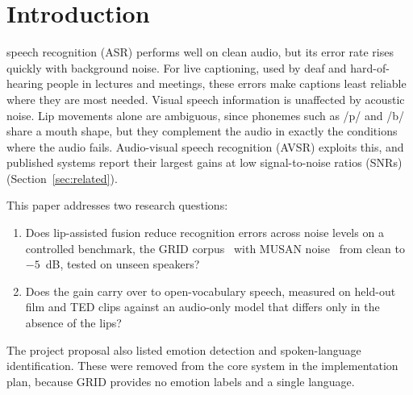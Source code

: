 \section{Introduction}
\label{sec:introduction}

 speech recognition (ASR) performs well on clean audio, but its error rate
rises quickly with background noise. For live captioning, used by deaf and hard-of-hearing people
in lectures and meetings, these errors make captions least reliable where they are most needed.
Visual speech information is unaffected by acoustic noise. Lip movements alone are ambiguous, since
phonemes such as /p/ and /b/ share a mouth shape, but they complement the audio in exactly the
conditions where the audio fails. Audio-visual speech recognition (AVSR) exploits this, and
published systems report their largest gains at low signal-to-noise ratios (SNRs)
(Section~\ref{sec:related}).

This paper addresses two research questions:
\begin{enumerate}
\item Does lip-assisted fusion reduce recognition errors across noise levels on a controlled
benchmark, the GRID corpus~\cite{cooke2006} with MUSAN noise~\cite{snyder2015} from clean to
$-5$~dB, tested on unseen speakers?
\item Does the gain carry over to open-vocabulary speech, measured on held-out film and TED clips
against an audio-only model that differs only in the absence of the lips?
\end{enumerate}
The project proposal also listed emotion detection and spoken-language identification. These were
removed from the core system in the implementation plan, because GRID provides no emotion labels
and a single language.

